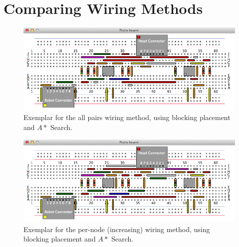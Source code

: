 \section{Comparing Wiring Methods}

\begin{figure}[H]
\begin{center}
\includegraphics[width=\textwidth]{Images/exemplar_all_pairs.png}
\caption[All pairs method exemplar]{Exemplar for the all pairs wiring method,
using blocking placement and $A*$ Search.}
\end{center}
\end{figure}

\begin{figure}[H]
\begin{center}
\includegraphics[width=\textwidth]{Images/exemplar_per_node_increasing.png}
\caption[Per-node (increasing) method exemplar]{Exemplar for the per-node
(increasing) wiring method, using blocking placement and $A*$ Search.}
\end{center}
\end{figure}

